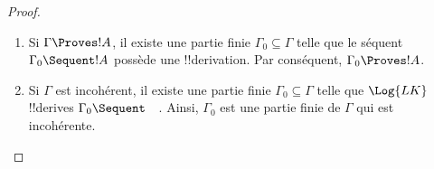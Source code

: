 \documentclass[../../../include/open-logic-section]{subfiles}
\begin{document}
\begin{proof}
  \begin{enumerate}
  \item Si $\Gamma \Proves !A$, il existe une partie finie
    $\Gamma_0 \subseteq \Gamma$ telle que le séquent
    $\Gamma_0 \Sequent !A$ possède une !!{derivation}.
    Par conséquent, $\Gamma_0 \Proves !A$.
  \item Si $\Gamma$ est incohérent, il existe une partie finie
    $\Gamma_0 \subseteq \Gamma$ telle que $\Log{LK}$
    !!{derive}s $\Gamma_0 \Sequent \quad$. Ainsi, $\Gamma_0$
    est une partie finie de $\Gamma$ qui est incohérente.
  \end{enumerate}
\end{proof}
\end{document}
